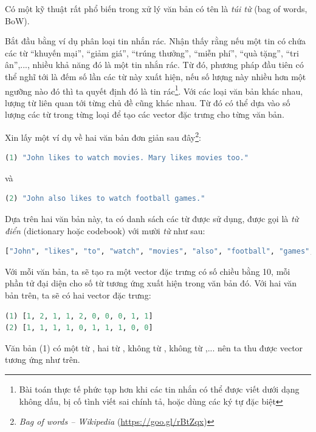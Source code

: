 Có một kỹ thuật rất phổ biến trong xử lý văn bản có tên là \textit{túi từ}
({bag of words, BoW}).
 
Bắt đầu bằng ví dụ phân loại tin nhắn rác. Nhận thấy rằng nếu một tin có chứa
các từ {``khuyến mại'', ``giảm giá'', ``trúng thưởng'', ``miễn phí'', ``quà tặng'', ``tri
ân'',...}, nhiều khả năng đó là một tin nhắn rác. Từ đó, phương pháp đầu tiên có
thể nghĩ tới là {đếm} số lần các từ này xuất hiện, nếu số lượng này nhiều hơn
một ngưỡng nào đó thì ta quyết định đó là tin rác\footnote{Bài toán thực tế phức
tạp hơn khi các tin nhắn có thể được viết dưới dạng không dấu, bị cố tình viết
sai chính tả, hoặc dùng các ký tự đặc biệt}. Với các loại văn bản khác nhau,
lượng từ liên quan tới từng chủ đề cũng khác nhau. Từ đó có thể dựa vào số lượng
các từ trong từng loại để tạo các vector đặc trưng cho từng văn bản.
 
{}
Xin lấy một ví dụ về hai văn bản đơn giản sau đây\footnote{\textit{Bag of
words -- Wikipedia} (\url{https://goo.gl/rBtZqx})}:
 
\begin{lstlisting}[language=Python]
(1) "John likes to watch movies. Mary likes movies too."
\end{lstlisting}
và   
\begin{lstlisting}[language=Python]
(2) "John also likes to watch football games." 
\end{lstlisting}
Dựa trên hai văn bản này, ta có danh sách các từ được sử dụng, được gọi là
\textit{từ điển} ({dictionary} hoặc {codebook}) với mười
\textit{từ} như sau:
 
\begin{lstlisting}[language=Python]
["John", "likes", "to", "watch", "movies", "also", "football", "games", "Mary", "too"] 
\end{lstlisting}
Với mỗi văn bản, ta sẽ tạo ra một vector đặc trưng có số chiều bằng 10, mỗi phần
tử đại diện cho số từ tương ứng xuất hiện trong văn bản đó. Với hai văn bản
trên, ta sẽ có hai vector đặc trưng:
\begin{lstlisting}[language=Python]
(1) [1, 2, 1, 1, 2, 0, 0, 0, 1, 1] 
(2) [1, 1, 1, 1, 0, 1, 1, 1, 0, 0] 
\end{lstlisting}
Văn bản (1) có một từ , hai từ , không từ
, không từ ,... nên ta thu được
vector tương ứng như trên.
 
